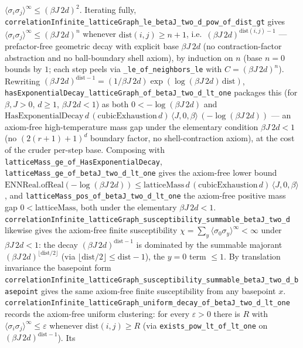 \documentclass[a4paper,11pt]{article}
\begin{document}
\(\langle\sigma_i\sigma_j\rangle^\infty\le(\beta J\,2d)^2\).  Iterating fully,
\texttt{correlationInfinite\_latticeGraph\_le\_betaJ\_two\_d\_pow\_of\_dist\_gt} gives
\(\langle\sigma_i\sigma_j\rangle^\infty\le(\beta J\,2d)^n\) whenever
\(\mathrm{dist}(i,j)\ge n+1\), i.e.\ \((\beta J\,2d)^{\mathrm{dist}(i,j)-1}\) ---
prefactor-free geometric decay with explicit base \(\beta J\,2d\) (no contraction-factor
abstraction and no ball-boundary shell axiom), by induction on \(n\) (base \(n=0\) bounds
by \(1\); each step peels via \texttt{\_le\_of\_neighbors\_le} with \(C=(\beta J\,2d)^n\)).
Rewriting \((\beta J\,2d)^{\mathrm{dist}-1}=(1/\beta J\,2d)\exp(\log(\beta J\,2d)\,\mathrm{dist})\),
\texttt{hasExponentialDecay\_latticeGraph\_of\_betaJ\_two\_d\_lt\_one} packages this (for
\(\beta,J>0\), \(d\ge1\), \(\beta J\,2d<1\)) as both \(0<-\log(\beta J\,2d)\) and
\(\mathrm{HasExponentialDecay}\,d\,(\mathrm{cubicExhaustion}\,d)\,\langle J,0,\beta\rangle\,
(-\log(\beta J\,2d))\) --- an axiom-free high-temperature mass gap under the elementary
condition \(\beta J\,2d<1\) (no \((2(r+1)+1)^d\) boundary factor, no shell-contraction
axiom), at the cost of the cruder per-step base.  Composing with
\texttt{latticeMass\_ge\_of\_HasExponentialDecay}, \texttt{latticeMass\_ge\_of\_betaJ\_two\_d\_lt\_one}
gives the axiom-free lower bound
\(\mathrm{ENNReal.ofReal}(-\log(\beta J\,2d))\le\mathrm{latticeMass}\,d\,(\mathrm{cubicExhaustion}\,d)\,\langle J,0,\beta\rangle\),
and \texttt{latticeMass\_pos\_of\_betaJ\_two\_d\_lt\_one} the axiom-free positive mass gap
\(0<\mathrm{latticeMass}\), both under the elementary \(\beta J\,2d<1\).
\texttt{correlationInfinite\_latticeGraph\_susceptibility\_summable\_betaJ\_two\_d} likewise
gives the axiom-free finite susceptibility \(\chi=\sum_y\langle\sigma_0\sigma_y\rangle^\infty<\infty\)
under \(\beta J\,2d<1\): the decay \((\beta J\,2d)^{\mathrm{dist}-1}\) is dominated by the
summable majorant \((\beta J\,2d)^{\lfloor\mathrm{dist}/2\rfloor}\) (via
\(\lfloor\mathrm{dist}/2\rfloor\le\mathrm{dist}-1\)), the \(y=0\) term \(\le1\).  By
translation invariance the basepoint form
\texttt{correlationInfinite\_latticeGraph\_susceptibility\_summable\_betaJ\_two\_d\_basepoint}
gives the same axiom-free finite susceptibility from any basepoint \(x\).
\texttt{correlationInfinite\_latticeGraph\_uniform\_decay\_of\_betaJ\_two\_d\_lt\_one} records
the axiom-free uniform clustering: for every \(\varepsilon>0\) there is \(R\) with
\(\langle\sigma_i\sigma_j\rangle^\infty\le\varepsilon\) whenever \(\mathrm{dist}(i,j)\ge R\)
(via \texttt{exists\_pow\_lt\_of\_lt\_one} on \((\beta J\,2d)^{\mathrm{dist}-1}\)).  Its
\end{document}
